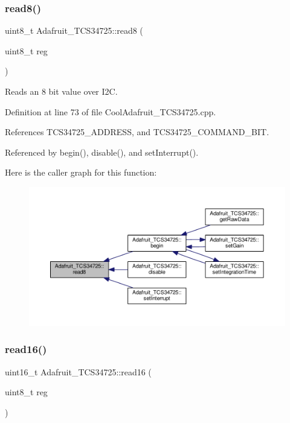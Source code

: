 \subsubsection{\texorpdfstring{read8()}{read8()}}
{\footnotesize\ttfamily uint8\+\_\+t Adafruit\+\_\+\+T\+C\+S34725\+::read8 (\begin{DoxyParamCaption}\item[{uint8\+\_\+t}]{reg }\end{DoxyParamCaption})}



Reads an 8 bit value over I2C. 



Definition at line 73 of file Cool\+Adafruit\+\_\+\+T\+C\+S34725.\+cpp.



References T\+C\+S34725\+\_\+\+A\+D\+D\+R\+E\+SS, and T\+C\+S34725\+\_\+\+C\+O\+M\+M\+A\+N\+D\+\_\+\+B\+IT.



Referenced by begin(), disable(), and set\+Interrupt().

Here is the caller graph for this function\+:\nopagebreak
\begin{figure}[H]
\begin{center}
\leavevmode
\includegraphics[width=350pt]{df/d54/class_adafruit___t_c_s34725_a3ffafbdd475d6baf9abda8dd067b5319_icgraph}
\end{center}
\end{figure}
\mbox{\label{class_adafruit___t_c_s34725_a6b9b65ff0f1e57797a1c05a43fd25385}} 
\subsubsection{\texorpdfstring{read16()}{read16()}}
{\footnotesize\ttfamily uint16\+\_\+t Adafruit\+\_\+\+T\+C\+S34725\+::read16 (\begin{DoxyParamCaption}\item[{uint8\+\_\+t}]{reg }\end{DoxyParamCaption})}



